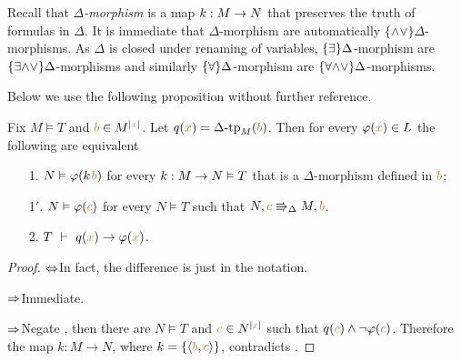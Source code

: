 % 
% 



Recall that \emph{$\Delta$-morphism\/} is a map $k:M\rightarrow N$ that preserves the truth of formulas in $\Delta$. It is immediate that $\Delta$-morphism are automatically $\{\mathord\wedge\mathord\vee\}\Delta$-morphisms. As $\Delta$ is closed under renaming of variables, $\{\exists\}\Delta$-morphism are $\{\exists\mathord\wedge\mathord\vee\}\Delta$-morphisms and similarly $\{\forall\}\Delta$-morphism are $\{\forall\mathord\wedge\mathord\vee\}\Delta$-morphisms.

Below we use the following proposition without further reference.
\def\.{\kern0.2ex}
\begin{proposition}\label{prop_pokj}
Fix $M\models T$ and ${\color{brown} b}\in M^{|{\color{brown} x}|}$. Let $q({\color{brown} x})=\Delta\mbox{\rm -tp}_M({\color{brown} b})$. Then for every $\varphi({\color{brown} x})\in L$ the following are equivalent
\begin{itemize}
\item[1.] $N\models\phi(k\.{\mr b})$ for every $k:M\rightarrow N\vDash T$ that is a $\Delta$-morphism defined in ${\color{brown} b}$;
\item[1$'$.] $N\vDash\varphi({\color{brown} c})$ for every $N\models T$ such that $N,{\color{brown} c}\Rrightarrow_\Delta  M,{\color{brown} b}$.
\item[2.] $T\ \proves\  q({\mr x})\imp\phi({\mr x})$.
\end{itemize}
\end{proposition}
\begin{proof} $\Leftrightarrow$\quad In fact, the difference is just in the notation.

$\Rightarrow$\quad Immediate.  

$\Rightarrow$\quad Negate , then there are $N\models T$ and ${\color{brown} c}\in N^{|{\color{brown} x}|}$ such that $q({\color{brown} c})\wedge\neg\varphi({\color{brown} c})$. Therefore the map $k:M\to N$, where $k=\{\langle{\color{brown}b},{\color{brown} c}\rangle\}$, contradicts .
\end{proof}

